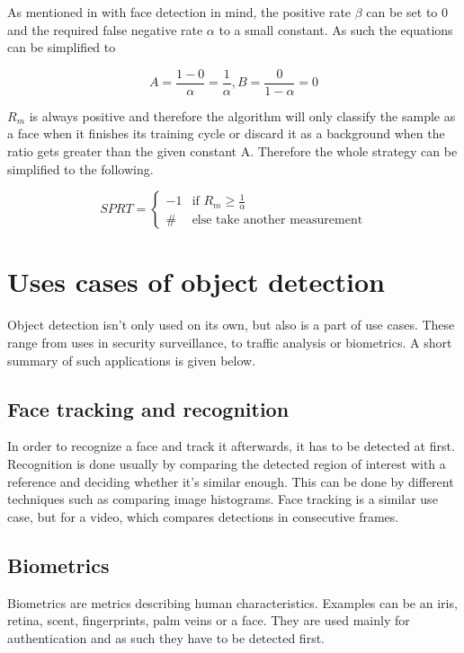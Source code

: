 As mentioned in \cite{sochman-matas-waldboost} with face detection in mind, the positive rate $\beta$ can be set to 0 and the required false negative rate $\alpha$ to a small constant. As such the equations can be simplified to

\begin{equation}
A=\frac{1-0}{\alpha}=\frac{1}{\alpha}, B=\frac{0}{1-\alpha}=0
\end{equation}

$R_{m}$ is always positive and therefore the algorithm will only classify the sample as a face when it finishes its training cycle or discard it as a background when the ratio gets greater than the given constant A. Therefore the whole strategy can be simplified to the following.

\[
 SPRT =
  \begin{cases}
   -1 & \text{if } R_{m} \geq \frac{1}{\alpha} \\
   \# & \text{else take another measurement} 
  \end{cases}
\]

\section{Uses cases of object detection}

Object detection isn't only used on its own, but also is a part of use cases. These range from uses in security surveillance, to traffic analysis or biometrics. A short summary of such applications is given below.

\subsection{Face tracking and recognition}\label{subsec:face-tracking}

In order to recognize a face and track it afterwards, it has to be detected at first. Recognition is done usually by comparing the detected region of interest with a reference and deciding whether it's similar enough. This can be done by different techniques such as comparing image histograms. Face tracking is a similar use case, but for a video, which compares detections in consecutive frames.

\subsection{Biometrics}

Biometrics are metrics describing human characteristics. Examples can be an iris, retina, scent, fingerprints, palm veins or a face. They are used mainly for authentication and as such they have to be detected first.

